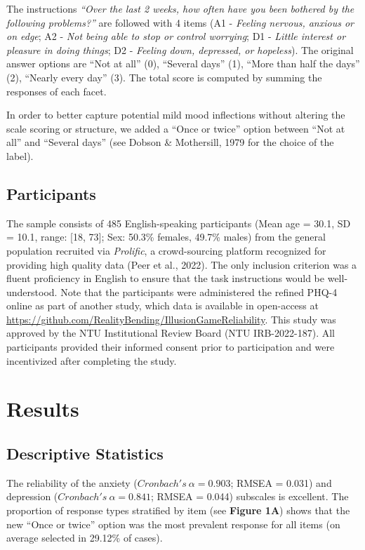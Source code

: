 \documentclass[
  man,floatsintext]{apa6}
\begin{document}
The instructions \emph{``Over the last 2 weeks, how often have you been bothered by the following problems?''} are followed with 4 items (A1 - \emph{Feeling nervous, anxious or on edge}; A2 - \emph{Not being able to stop or control worrying}; D1 - \emph{Little interest or pleasure in doing things}; D2 - \emph{Feeling down, depressed, or hopeless}). The original answer options are ``Not at all'' (0), ``Several days'' (1), ``More than half the days'' (2), ``Nearly every day'' (3). The total score is computed by summing the responses of each facet.

In order to better capture potential mild mood inflections without altering the scale scoring or structure, we added a ``Once or twice'' option between ``Not at all'' and ``Several days'' (see Dobson \& Mothersill, 1979 for the choice of the label).

\hypertarget{participants}{%
\subsection{Participants}\label{participants}}

The sample consists of 485 English-speaking participants (Mean age = 30.1, SD = 10.1, range: {[}18, 73{]}; Sex: 50.3\% females, 49.7\% males) from the general population recruited via \emph{Prolific}, a crowd-sourcing platform recognized for providing high quality data (Peer et al., 2022). The only inclusion criterion was a fluent proficiency in English to ensure that the task instructions would be well-understood. Note that the participants were administered the refined PHQ-4 online as part of another study, which data is available in open-access at \url{https://github.com/RealityBending/IllusionGameReliability}. This study was approved by the
NTU Institutional Review Board (NTU IRB-2022-187).
All participants provided their informed consent prior to participation and were incentivized after completing the study.

\hypertarget{results}{%
\section{Results}\label{results}}

\hypertarget{descriptive-statistics}{%
\subsection{Descriptive Statistics}\label{descriptive-statistics}}

The reliability of the anxiety (\(Cronbach's~\alpha = 0.903\); RMSEA = 0.031) and depression (\(Cronbach's~\alpha = 0.841\); RMSEA = 0.044) subscales is excellent. The proportion of response types stratified by item (see \textbf{Figure 1A}) shows that the new ``Once or twice'' option was the most prevalent response for all items (on average selected in 29.12\% of cases).
\end{document}

